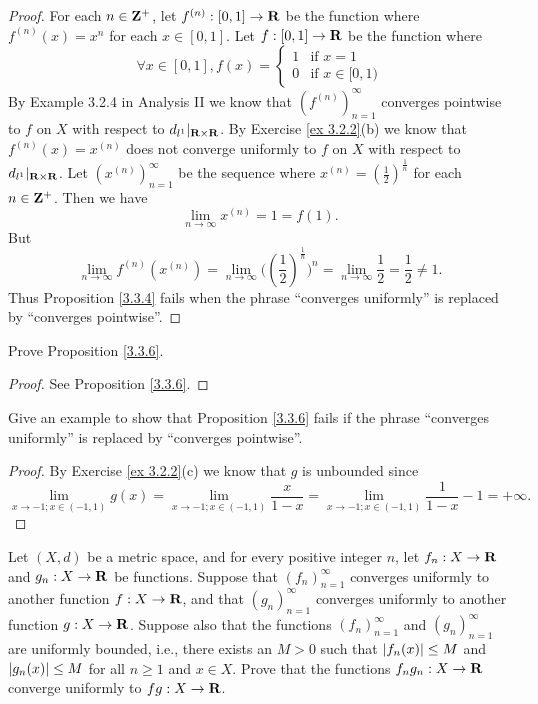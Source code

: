 \begin{proof}
    For each \(n \in \mathbf{Z}^+\), let \(f^{(n)} : [0, 1] \to \mathbf{R}\) be the function where \(f^{(n)}(x) = x^n\) for each \(x \in [0, 1]\).
    Let \(f : [0, 1] \to \mathbf{R}\) be the function where
    \[
        \forall x \in [0, 1], f(x) = \begin{cases}
            1 & \text{if } x = 1        \\
            0 & \text{if } x \in [0, 1)
        \end{cases}
    \]
    By Example 3.2.4 in Analysis II we know that \((f^{(n)})_{n = 1}^\infty\) converges pointwise to \(f\) on \(X\) with respect to \(d_{l^1}|_{\mathbf{R} \times \mathbf{R}}\).
    By Exercise \ref{ex 3.2.2}(b) we know that \(f^{(n)}(x) = x^{(n)}\) does not converge uniformly to \(f\) on \(X\) with respect to \(d_{l^1}|_{\mathbf{R} \times \mathbf{R}}\).
    Let \((x^{(n)})_{n = 1}^\infty\) be the sequence where \(x^{(n)} = (\frac{1}{2})^{\frac{1}{n}}\) for each \(n \in \mathbf{Z}^+\).
    Then we have
    \[
        \lim_{n \to \infty} x^{(n)} = 1 = f(1).
    \]
    But
    \[
        \lim_{n \to \infty} f^{(n)}(x^{(n)}) = \lim_{n \to \infty} \big((\frac{1}{2})^{\frac{1}{n}}\big)^n = \lim_{n \to \infty} \frac{1}{2} = \frac{1}{2} \neq 1.
    \]
    Thus Proposition \ref{3.3.4} fails when the phrase ``converges uniformly'' is replaced by ``converges pointwise''.
\end{proof}

\begin{exercise}\label{ex 3.3.6}
    Prove Proposition \ref{3.3.6}.
\end{exercise}

\begin{proof}
    See Proposition \ref{3.3.6}.
\end{proof}

\begin{exercise}\label{ex 3.3.7}
    Give an example to show that Proposition \ref{3.3.6} fails if the phrase ``converges uniformly'' is replaced by ``converges pointwise''.
\end{exercise}

\begin{proof}
    By Exercise \ref{ex 3.2.2}(c) we know that \(g\) is unbounded since
    \[
        \lim_{x \to -1 ; x \in (-1, 1)} g(x) = \lim_{x \to -1 ; x \in (-1, 1)} \frac{x}{1 - x} = \lim_{x \to -1 ; x \in (-1, 1)} \frac{1}{1 - x} - 1 = +\infty.
    \]
\end{proof}

\begin{exercise}\label{ex 3.3.8}
    Let \((X, d)\) be a metric space, and for every positive integer \(n\), let \(f_n : X \to \mathbf{R}\) and \(g_n : X \to \mathbf{R}\) be functions.
    Suppose that \((f_n)_{n = 1}^\infty\) converges uniformly to another function \(f : X \to \mathbf{R}\), and that \((g_n)_{n = 1}^\infty\) converges uniformly to another function \(g : X \to \mathbf{R}\).
    Suppose also that the functions \((f_n)_{n = 1}^\infty\) and \((g_n)_{n = 1}^\infty\) are uniformly bounded, i.e., there exists an \(M > 0\) such that \(\left\lvert f_n(x)\right\rvert \leq M\) and \(\left\lvert g_n(x)\right\rvert \leq M\) for all \(n \geq 1\) and \(x \in X\).
    Prove that the functions \(f_n g_n : X \to \mathbf{R}\) converge uniformly to \(fg : X \to \mathbf{R}\).
\end{exercise}

